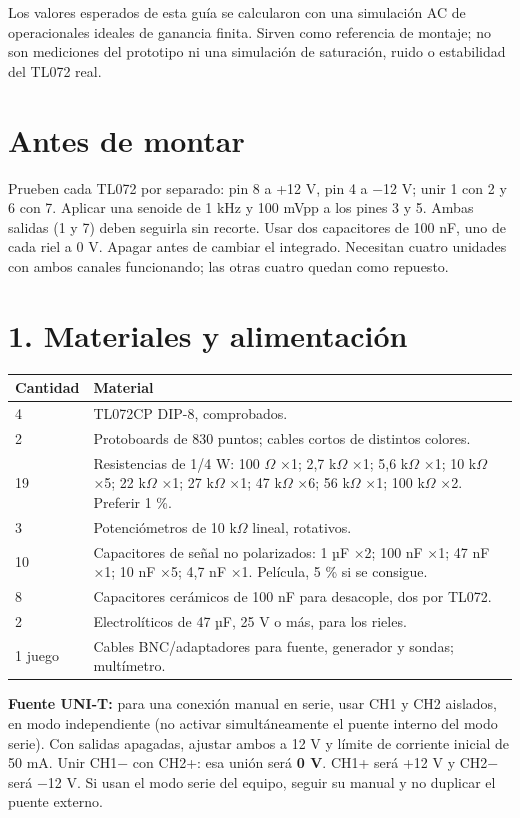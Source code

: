 \documentclass[10pt,a4paper]{article}
\newcommand{\siguientepagina}{\clearpage}
\begin{document}
Los valores esperados de esta guía se calcularon con una simulación AC de operacionales ideales de ganancia finita. Sirven como referencia de montaje; no son mediciones del prototipo ni una simulación de saturación, ruido o estabilidad del TL072 real.

\section{Antes de montar}
Prueben cada TL072 por separado: pin 8 a +12 V, pin 4 a −12 V; unir 1 con 2 y 6 con 7. Aplicar una senoide de 1 kHz y 100 mVpp a los pines 3 y 5. Ambas salidas (1 y 7) deben seguirla sin recorte. Usar dos capacitores de 100 nF, uno de cada riel a 0 V. Apagar antes de cambiar el integrado. Necesitan cuatro unidades con ambos canales funcionando; las otras cuatro quedan como repuesto.
\siguientepagina
\section{1. Materiales y alimentación}
\begin{tabularx}{\linewidth}{lX}\toprule Cantidad & Material\\\midrule
4 & TL072CP DIP-8, comprobados.\\
2 & Protoboards de 830 puntos; cables cortos de distintos colores.\\
19 & Resistencias de 1/4 W: 100 \ensuremath{\Omega} ×1; 2,7 k\ensuremath{\Omega} ×1; 5,6 k\ensuremath{\Omega} ×1; 10 k\ensuremath{\Omega} ×5; 22 k\ensuremath{\Omega} ×1; 27 k\ensuremath{\Omega} ×1; 47 k\ensuremath{\Omega} ×6; 56 k\ensuremath{\Omega} ×1; 100 k\ensuremath{\Omega} ×2. Preferir 1 \%.\\
3 & Potenciómetros de 10 k\ensuremath{\Omega} lineal, rotativos.\\
10 & Capacitores de señal no polarizados: 1 µF ×2; 100 nF ×1; 47 nF ×1; 10 nF ×5; 4,7 nF ×1. Película, 5 \% si se consigue.\\
8 & Capacitores cerámicos de 100 nF para desacople, dos por TL072.\\
2 & Electrolíticos de 47 µF, 25 V o más, para los rieles.\\
1 juego & Cables BNC/adaptadores para fuente, generador y sondas; multímetro.\\\bottomrule
\end{tabularx}

\textbf{Fuente UNI-T:} para una conexión manual en serie, usar CH1 y CH2 aislados, en modo independiente (no activar simultáneamente el puente interno del modo serie). Con salidas apagadas, ajustar ambos a 12 V y límite de corriente inicial de 50 mA. Unir CH1− con CH2+: esa unión será \textbf{0 V}. CH1+ será +12 V y CH2− será −12 V. Si usan el modo serie del equipo, seguir su manual y no duplicar el puente externo.
\end{document}
